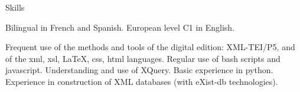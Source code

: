 











\begin{rubric}{Skills}
                    \entry*
                    
                Bilingual in French and Spanish. European level C1 in English.
                    \entry*
                    
                
                    \entry*
                    
                
                    \entry*
                    
                Frequent use of the methods and tools of the digital edition: XML-TEI/P5, and of
                    the xml, xsl, \LaTeX, css, html languages. Regular use of bash scripts and javascript.
                    Understanding and use of XQuery. Basic experience in python. Experience in
                    construction of XML databases (with eXist-db technologies).
                    \entry*
                    
                \end{rubric}



